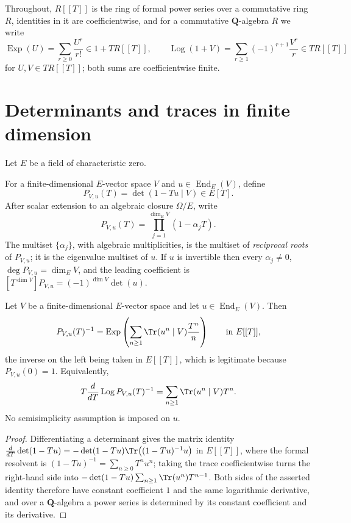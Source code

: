 Throughout, $R[[T]]$ is the ring of formal power series over a commutative
ring $R$, identities in it are coefficientwise, and for a commutative
$\mathbf Q$-algebra $R$ we write
\[
  \operatorname{Exp}(U)=\sum_{r\geq0}\frac{U^r}{r!}\in1+TR[[T]],
  \qquad
  \operatorname{Log}(1+V)=\sum_{r\geq1}(-1)^{r+1}\frac{V^r}{r}\in TR[[T]]
\]
for $U,V\in TR[[T]]$; both sums are coefficientwise finite.

\section{Determinants and traces in finite dimension}\label{sec:zla-det-trace}

Let $E$ be a field of characteristic zero.

\begin{definition}
\label{def:zla-recip-charpoly}
\leanok
For a finite-dimensional $E$-vector space $V$ and
$u\in\operatorname{End}_E(V)$, define
\[
  P_{V,u}(T)=\det(1-Tu\mid V)\in E[T].
\]
After scalar extension to an algebraic closure $\Omega/E$, write
\[
  P_{V,u}(T)=\prod_{j=1}^{\dim_EV}(1-\alpha_jT).
\]
The multiset $\{\alpha_j\}$, with algebraic multiplicities, is the multiset of
\emph{reciprocal roots} of $P_{V,u}$; it is the eigenvalue multiset of $u$.
If $u$ is invertible then every $\alpha_j\neq0$, $\deg P_{V,u}=\dim_EV$, and
the leading coefficient is
$[T^{\dim V}]P_{V,u}=(-1)^{\dim V}\det(u)$.
\end{definition}

\begin{lemma}
\label{lem:zla-trace-det}
\leanok
Let $V$ be a finite-dimensional $E$-vector space and let
$u\in\operatorname{End}_E(V)$.  Then
\[
  P_{V,u}(T)^{-1}
  =\operatorname{Exp}\left(\sum_{n\geq1}\Tr(u^n\mid V)\frac{T^n}{n}\right)
  \qquad\text{in }E[[T]],
\]
the inverse on the left being taken in $E[[T]]$, which is legitimate because
$P_{V,u}(0)=1$.  Equivalently,
\[
  T\frac{d}{dT}\operatorname{Log}P_{V,u}(T)^{-1}
  =\sum_{n\geq1}\Tr(u^n\mid V)T^n.
\]
No semisimplicity assumption is imposed on $u$.
\end{lemma}
\begin{proof}
\leanok
Differentiating a determinant gives the matrix identity
$\frac{d}{dT}\det(1-Tu)=-\det(1-Tu)\Tr\!\left((1-Tu)^{-1}u\right)$ in
$E[[T]]$, where the formal resolvent is
$(1-Tu)^{-1}=\sum_{n\geq0}T^nu^n$; taking the trace coefficientwise turns the
right-hand side into $-\det(1-Tu)\sum_{n\geq1}\Tr(u^n)T^{n-1}$.  Both sides of
the asserted identity therefore have constant coefficient $1$ and the same
logarithmic derivative, and over a $\mathbf Q$-algebra a power series is
determined by its constant coefficient and its derivative.
\end{proof}

